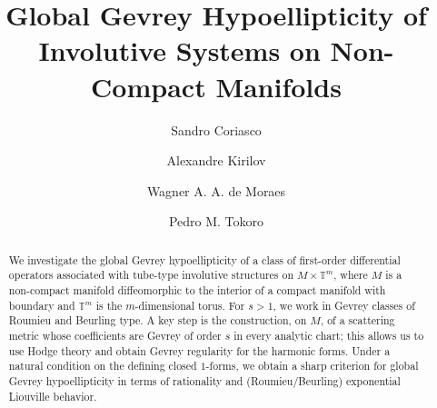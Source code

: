 \documentclass[11pt,reqno]{amsart}
\numberwithin{equation}{section}
\begin{document}
\title[Global Gevrey Hypoellipticity for Involutive Systems]{Global Gevrey Hypoellipticity of Involutive Systems on Non-Compact Manifolds}

	
	\author[S. Coriasco]{Sandro Coriasco}
	\address{
		Dipartimento di Matematica ``Giuseppe Peano'', 
		Università Degli Studi di Torino, 
		Via Carlo Alberto 10, CAP 0123, Torino, 
		Italia }

	
	\author[A. Kirilov]{Alexandre Kirilov}
	\address{
		Departamento de Matem\'atica, 
		Universidade Federal do Paran\'a,  
		Caixa Postal 19096, CEP 81530-090, Curitiba, Paran\'a, 
		Brasil}
	
	\author[W. de Moraes]{Wagner A. A. de Moraes}
	\address{
		Departamento de Matem\'atica,  
		Universidade Federal do Paran\'a,  
		Caixa Postal 19096\\  CEP 81530-090, Curitiba, Paran\'a, 
		Brasil}
	
	\author[P. Tokoro]{Pedro M. Tokoro}
	\address{
		Programa de P\'os-Gradua\c c\~ao em Matem\'atica,  
		Universidade Federal do Paran\'a,  
		Caixa Postal 19096\\  CEP 81530-090, Curitiba, Paran\'a,  
		Brasil}
	
	
	
	

\begin{abstract}
	We investigate the global Gevrey hypoellipticity of a class of first-order differential operators associated with tube-type involutive structures on $M\times\mathbb{T}^m$, where $M$ is a non-compact manifold diffeomorphic to the interior of a compact manifold with boundary and $\mathbb{T}^m$ is the $m$-dimensional torus. For $s>1$, we work in Gevrey classes of Roumieu and Beurling type. A key step is the construction, on $M$, of a scattering metric whose coefficients are Gevrey of order $s$ in every analytic chart; this allows us to use Hodge theory and obtain Gevrey regularity for the harmonic forms. Under a natural condition on the defining closed $1$-forms, we obtain a sharp criterion for global Gevrey hypoellipticity in terms of rationality and (Roumieu/Beurling) exponential Liouville behavior.
	\end{abstract}
	
\end{document}
